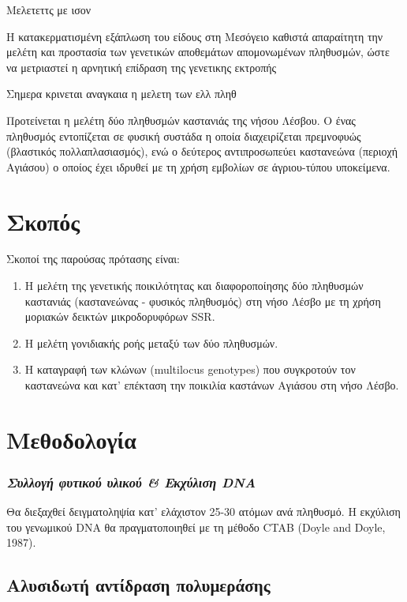 \documentclass[12pt,a4paper,]{report}
\begin{document}
Μελετεττς με ισον

Η κατακερματισμένη εξάπλωση του είδους στη Μεσόγειο καθιστά απαραίτητη
την μελέτη και προστασία των γενετικών αποθεμάτων απομονωμένων
πληθυσμών, ώστε να μετριαστεί η αρνητική επίδραση της γενετικης εκτροπής

Σημερα κρινεται αναγκαια η μελετη των ελλ πληθ

Προτείνεται η μελέτη δύο πληθυσμών καστανιάς της νήσου Λέσβου. Ο ένας
πληθυσμός εντοπίζεται σε φυσική συστάδα η οποία διαχειρίζεται πρεμνοφυώς
(βλαστικός πολλαπλασιασμός), ενώ ο δεύτερος αντιπροσωπεύει καστανεώνα
(περιοχή Αγιάσου) ο οποίος έχει ιδρυθεί με τη χρήση εμβολίων σε
άγριου-τύπου υποκείμενα.

\section{Σκοπός}

Σκοποί της παρούσας πρότασης είναι:

\begin{enumerate}
\def\labelenumi{\arabic{enumi}.}
\item
  Η μελέτη της γενετικής ποικιλότητας και διαφοροποίησης δύο πληθυσμών
  καστανιάς (καστανεώνας - φυσικός πληθυσμός) στη νήσο Λέσβο με τη χρήση
  μοριακών δεικτών μικροδορυφόρων SSR.
\item
  Η μελέτη γονιδιακής ροής μεταξύ των δύο πληθυσμών.
\item
  Η καταγραφή των κλώνων (multilocus genotypes) που συγκροτούν τον
  καστανεώνα και κατ' επέκταση την ποικιλία καστάνων Αγιάσου στη νήσο
  Λέσβο.
\end{enumerate}

\section{Μεθοδολογία}

\hypertarget{----dna}{%
\subsubsection{\texorpdfstring{\emph{Συλλογή φυτικού υλικού \& Εκχύλιση
DNA}}{Συλλογή φυτικού υλικού \& Εκχύλιση DNA}}\label{----dna}}

Θα διεξαχθεί δειγματοληψία κατ' ελάχιστον 25-30 ατόμων ανά πληθυσμό. Η
εκχύλιση του γενωμικού DNA θα πραγματοποιηθεί με τη μέθοδο CTAB (Doyle
and Doyle, 1987).

\hypertarget{--}{%
\subsection{Αλυσιδωτή αντίδραση πολυμεράσης}\label{--}}
\end{document}
